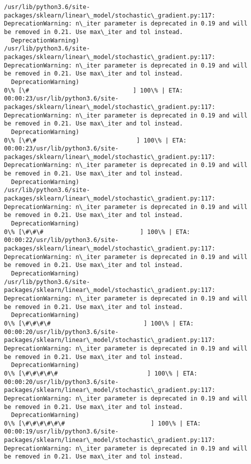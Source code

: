 \documentclass[11pt]{article}
\begin{document}
    \begin{Verbatim}[commandchars=\\\{\}]
/usr/lib/python3.6/site-packages/sklearn/linear\_model/stochastic\_gradient.py:117: DeprecationWarning: n\_iter parameter is deprecated in 0.19 and will be removed in 0.21. Use max\_iter and tol instead.
  DeprecationWarning)
/usr/lib/python3.6/site-packages/sklearn/linear\_model/stochastic\_gradient.py:117: DeprecationWarning: n\_iter parameter is deprecated in 0.19 and will be removed in 0.21. Use max\_iter and tol instead.
  DeprecationWarning)
0\% [\#                             ] 100\% | ETA: 00:00:23/usr/lib/python3.6/site-packages/sklearn/linear\_model/stochastic\_gradient.py:117: DeprecationWarning: n\_iter parameter is deprecated in 0.19 and will be removed in 0.21. Use max\_iter and tol instead.
  DeprecationWarning)
0\% [\#\#                            ] 100\% | ETA: 00:00:23/usr/lib/python3.6/site-packages/sklearn/linear\_model/stochastic\_gradient.py:117: DeprecationWarning: n\_iter parameter is deprecated in 0.19 and will be removed in 0.21. Use max\_iter and tol instead.
  DeprecationWarning)
/usr/lib/python3.6/site-packages/sklearn/linear\_model/stochastic\_gradient.py:117: DeprecationWarning: n\_iter parameter is deprecated in 0.19 and will be removed in 0.21. Use max\_iter and tol instead.
  DeprecationWarning)
0\% [\#\#\#                           ] 100\% | ETA: 00:00:22/usr/lib/python3.6/site-packages/sklearn/linear\_model/stochastic\_gradient.py:117: DeprecationWarning: n\_iter parameter is deprecated in 0.19 and will be removed in 0.21. Use max\_iter and tol instead.
  DeprecationWarning)
/usr/lib/python3.6/site-packages/sklearn/linear\_model/stochastic\_gradient.py:117: DeprecationWarning: n\_iter parameter is deprecated in 0.19 and will be removed in 0.21. Use max\_iter and tol instead.
  DeprecationWarning)
0\% [\#\#\#\#                          ] 100\% | ETA: 00:00:20/usr/lib/python3.6/site-packages/sklearn/linear\_model/stochastic\_gradient.py:117: DeprecationWarning: n\_iter parameter is deprecated in 0.19 and will be removed in 0.21. Use max\_iter and tol instead.
  DeprecationWarning)
0\% [\#\#\#\#\#                         ] 100\% | ETA: 00:00:20/usr/lib/python3.6/site-packages/sklearn/linear\_model/stochastic\_gradient.py:117: DeprecationWarning: n\_iter parameter is deprecated in 0.19 and will be removed in 0.21. Use max\_iter and tol instead.
  DeprecationWarning)
0\% [\#\#\#\#\#\#                        ] 100\% | ETA: 00:00:19/usr/lib/python3.6/site-packages/sklearn/linear\_model/stochastic\_gradient.py:117: DeprecationWarning: n\_iter parameter is deprecated in 0.19 and will be removed in 0.21. Use max\_iter and tol instead.

\end{Verbatim}
\end{document}
